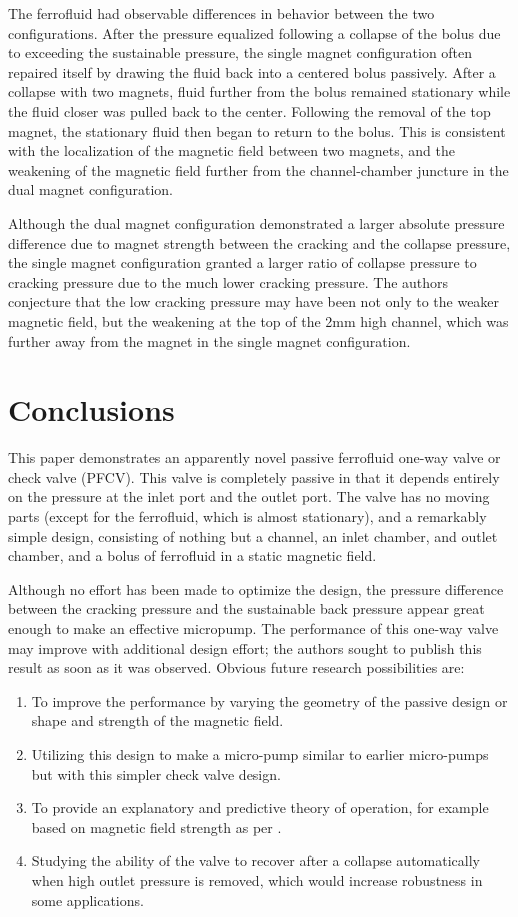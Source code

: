 \documentclass[twocolumn,10pt]{asme2ej}
\begin{document}
The ferrofluid had observable differences in behavior between the two
configurations.  After the pressure equalized
following a collapse of the bolus due to
exceeding the sustainable pressure, the single magnet
configuration often repaired itself by drawing the fluid back
into a centered bolus passively.
After a collapse with two magnets, fluid further from the bolus
remained stationary while the fluid closer was pulled back to the
center. Following the removal of the top magnet, the stationary fluid
then began to return to the bolus. This is consistent with the
localization of the magnetic field between two magnets, and the
weakening of the magnetic field further from the channel-chamber
juncture in the dual magnet configuration.

Although the dual magnet configuration demonstrated a larger absolute
pressure difference due to magnet strength between the
cracking and the collapse pressure, the single magnet configuration
granted a larger ratio of collapse pressure to cracking
pressure due to the much lower cracking pressure.
The authors conjecture that the low cracking pressure may have
been not only to the weaker magnetic field, but the weakening at the
top of the 2mm high channel, which was further away from the magnet
in the single magnet configuration.

\section{Conclusions}

This paper demonstrates an apparently novel passive ferrofluid one-way
valve or check valve (PFCV). This valve is completely passive in that
it depends entirely on the pressure at the inlet port and the outlet
port. The valve has no moving parts (except for the ferrofluid, which
is almost stationary), and a remarkably simple design, consisting of
nothing but a channel, an inlet chamber, and outlet chamber,
and a bolus of ferrofluid in a
static magnetic field.

Although no effort has been made to optimize the design, the pressure
difference between the cracking pressure and the sustainable back
pressure appear great enough to make an effective micropump. The
performance of this one-way valve may improve with additional design
effort; the authors sought to publish this result as soon as it was
observed.  Obvious future research possibilities are:
\begin{enumerate}
\item  To improve the
performance by varying the geometry of the passive design or shape and
strength of the magnetic field.
\item Utilizing this design to make a micro-pump
similar to earlier micro-pumps but with this simpler check valve
design.
\item To provide an explanatory and predictive theory of operation,
for example based on magnetic field strength as per \cite{ando2009ferrofluidic}.
\item Studying the ability of the valve to recover after
  a collapse automatically when high outlet pressure is removed,
  which would increase robustness in some applications.
\end{enumerate}
\end{document}
